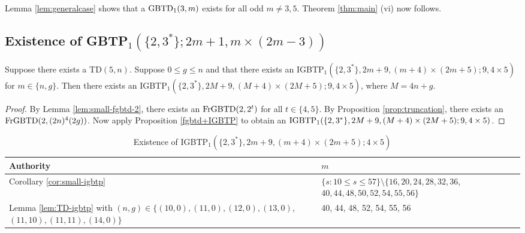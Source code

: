 \documentclass[draft, 11pt]{article}
\begin{document}
 Lemma \ref{lem:generalcase}
 shows that a ${\rm GBTD}_1(3,m)$ exists for all odd $m\not=3,5$. Theorem \ref{thm:main} (vi) now follows.


 
 
 \subsection{Existence of GBTP$_1(\{2,3^*\};2m+1,m\times(2m-3))$}




 \begin{lemma}
 \label{lem:TD-igbtp}
 Suppose there exists a TD$(5,n)$. Suppose $0\leq g\leq n$ and that there exists
 an IGBTP$_1(\{2,3^*\},2m+9,(m+4)\times (2m+5);9,4\times 5)$ for
 $m\in\{n, g\}$.
 Then there exists an IGBTP$_1(\{2,3^*\},2M+9, (M+4)\times (2M+5);9,4\times 5)$, where $M=4n+g$.
 \end{lemma}

\begin{proof}
By Lemma \ref{lem:small-fgbtd-2}, there exists an ${\rm
FrGBTD}(2,2^t)$ for all $t\in\{4,5\}$. By Proposition
\ref{prop:truncation}, there exists an ${\rm
FrGBTD}(2,(2n)^4(2g))$. Now apply Proposition \ref{fgbtd+IGBTP}
to obtain an ${\rm
IGBTP}_1(\{2,3^*\},2M+9,(M+4)\times (2M+5);9,4\times 5)$.
\end{proof}

 


\begin{table}
\small
\centering \caption{Existence of IGBTP$_1(\{2,3^*\},2m+9,(m+4)\times (2m+5);4\times 5)$}
 \label{GBTPauthority}
\begin{tabular}{p{90mm}p{60mm}}
 \hline
 Authority & $m$ \\
 \hline 
 Corollary \ref{cor:small-igbtp} & $\{s: 10\le s\le 57\}\setminus\{16,20,24, 28,32, 36$, $40,44,48, 50, 52,54,55,56\}$ \\
 Lemma \ref{lem:TD-igbtp} with $(n,g)\in\{(10,0), (11,0), (12,0),(13,0)$, $(11,10),(11,11),(14,0)\}$
 & 40, 44, 48, 52, 54, 55, 56 \\
 \hline
 \end{tabular}
 \end{table}
\end{document}
